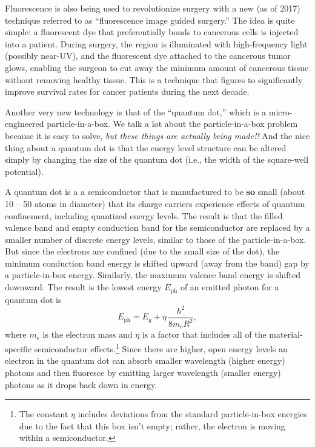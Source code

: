 Fluorescence is also being used to revolutionize surgery with a new
(as of 2017) technique referred to as ``fluorescence image guided surgery.''
The idea is quite simple: a fluorescent dye that preferentially bonds to
cancerous cells is injected into a patient. During surgery, the region
is illuminated with high-frequency light (possibly near-UV), and the
fluorescent dye attached to the cancerous tumor glows, enabling the
surgeon to cut away the minimum amount of cancerous tissue without
removing healthy tissue. This is a technique that figures to significantly
improve survival rates for cancer patients during the next decade.

Another very new technology is that of the ``quantum dot,'' which
is a micro-engineered particle-in-a-box. We talk a lot about the
particle-in-a-box problem because it is easy to solve, {\it but these
things are actually being made!!} And the nice thing about a quantum dot
is that the energy level structure can be altered simply by changing the
size of the quantum dot (i.e., the width of the square-well potential).

A quantum dot is a a semiconductor that is manufactured to be
{\bf so} small (about 10 -- 50 atoms in diameter) that its charge
carriers experience effects of quantum confinement, including
quantized energy levels. The result is that the filled valence band
and empty conduction band for the semiconductor are replaced by a smaller
number of discrete energy levels, similar to those of the particle-in-a-box.
But since the electrons are confined
(due to the small size of the dot), the minimum conduction band energy
is shifted upward (away from the band) gap by a particle-in-box energy.
Similarly, the maximum valence band energy is shifted downward.
The result is the lowest energy $E_\text{ph}$ of an emitted photon for a 
quantum dot is
\begin{equation}
E_\text{ph}=E_g+\eta\, \frac{h^2}{8m_\text{e}R^2} , 
\label{eq:QDot}
\end{equation}
where $m_\text{e}$ is the electron
mass and $\eta$ is a factor that includes all of the material-specific 
semiconductor effects.\footnote{The constant $\eta$ includes deviations
from the standard particle-in-box energies due to the fact that this box
isn't empty; rather, the electron is moving within a semiconductor.}
Since there are higher, open energy levels an electron in the quantum 
dot can absorb smaller wavelength (higher energy) photons and then 
fluoresce by emitting larger wavelength (smaller energy) photons 
as it drops back down in energy.

